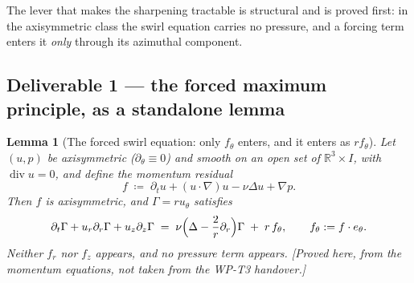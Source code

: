 \documentclass[11pt]{article}
\newtheorem{lemma}[theorem]{Lemma}
\theoremstyle{definition}
\theoremstyle{remark}
\newcommand{\R}{\mathbb{R}}
\newcommand{\grad}{\nabla}
\newcommand{\divg}{\operatorname{div}}
\begin{document}
The lever that makes the sharpening tractable is structural and is proved
first: in the axisymmetric class the swirl equation carries no pressure, and a
forcing term enters it \emph{only} through its azimuthal component.

\subsection{Deliverable 1 --- the forced maximum principle, as a standalone
lemma}
\label{subsec:wpt3-lemma}

\begin{lemma}[The forced swirl equation: only $f_\theta$ enters, and it enters
  as $rf_\theta$]\label{lem:wpt3-forced-swirl}
  Let $(u,p)$ be axisymmetric ($\partial_\theta\equiv0$) and smooth on an open
  set of $\R^3\times I$, with $\divg u=0$, and define the momentum residual
  \[
    f\;\coloneqq\;\partial_tu+(u\cdot\grad)u-\nu\Delta u+\grad p .
  \]
  Then $f$ is axisymmetric, and $\Gamma=ru_\theta$ satisfies
  \begin{equation}\label{eq:wpt3-forced-gamma}
    \partial_t\Gamma+u_r\partial_r\Gamma+u_z\partial_z\Gamma
      \;=\;\nu\Bigl(\Delta-\frac2r\partial_r\Bigr)\Gamma
      \;+\;r\,f_\theta ,
    \qquad f_\theta:=f\cdot e_\theta .
  \end{equation}
  Neither $f_r$ nor $f_z$ appears, and no pressure term appears.
  \emph{[Proved here, from the momentum equations, not taken from the WP-T3
  handover.]}
\end{lemma}
\end{document}
